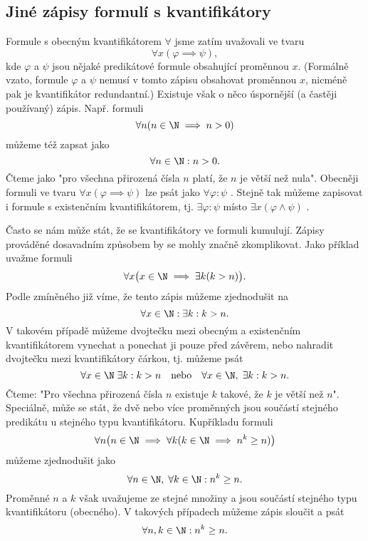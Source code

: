 \subsection{Jiné zápisy formulí s kvantifikátory}
Formule s obecným kvantifikátorem $\forall$ jsme zatím uvažovali ve tvaru
\begin{equation*}
    \forall x(\varphi \implies \psi),
\end{equation*}
kde $\varphi$ a $\psi$ jsou nějaké predikátové formule obsahující proměnnou $x$. (Formálně vzato, formule $\varphi$ a $\psi$ nemusí v tomto zápisu obsahovat proměnnou $x$, nicméně pak je kvantifikátor redundantní.) Existuje však o něco úspornější (a častěji používaný) zápis. Např. formuli
\begin{equation*}
    \forall n (n \in \N \implies n > 0)
\end{equation*}
můžeme též zapsat jako
\begin{equation*}
    \forall n \in \N : n > 0.
\end{equation*}
Čteme jako "pro všechna přirozená čísla $n$ platí, že $n$ je větší než nula". Obecněji formuli ve tvaru $\forall x(\varphi \implies \psi)$ lze psát jako $\forall \varphi : \psi$ . Stejně tak můžeme zapisovat i formule s existenčním kvantifikátorem, tj. $\exists \varphi : \psi$ místo $\exists x (\varphi \land \psi)$ .
\medskip

Často se nám může stát, že se kvantifikátory ve formuli kumulují. Zápisy prováděné dosavadním způsobem by se mohly značně zkomplikovat. Jako příklad uvažme formuli
\begin{equation*}
    \forall x \bigl(x \in \N \implies \exists k (k > n)\bigr).
\end{equation*}
Podle zmíněného již víme, že tento zápis můžeme zjednodušit na
\begin{equation*}
    \forall x \in \N : \exists k : k > n.
\end{equation*}
V takovém případě můžeme dvojtečku mezi obecným a existenčním kvantifikátorem vynechat a ponechat ji pouze před závěrem, nebo nahradit dvojtečku mezi kvantifikátory čárkou, tj. můžeme psát
\begin{equation*}
    \forall x \in \N\;\exists k : k > n\quad\text{nebo}\quad\forall x \in \N ,\;\exists k : k > n.
\end{equation*}
Čteme: "Pro všechna přirozená čísla $n$ existuje $k$ takové, že $k$ je větší než $n$". Speciálně, může se stát, že dvě nebo více proměnných jsou součástí stejného predikátu u stejného typu kvantifikátoru. Kupříkladu formuli
\begin{equation*}
    \forall n \bigl(n\in\N \implies \forall k(k\in\N \implies n^k \geq n)\bigr)
\end{equation*}
můžeme zjednodušit jako
\begin{equation*}
    \forall n\in\N ,\; \forall k\in\N : n^k\geq n.
\end{equation*}
Proměnné $n$ a $k$ však uvažujeme ze stejné množiny a jsou součástí stejného typu kvantifikátoru (obecného). V takových případech můžeme zápis sloučit a psát
\begin{equation*}
    \forall n,k\in\N : n^k\geq n.
\end{equation*}

